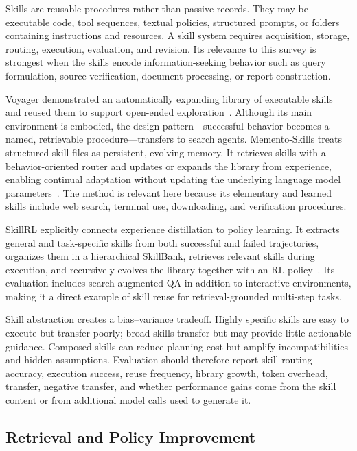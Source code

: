 Skills are reusable procedures rather than passive records. They may be executable code, tool sequences, textual policies, structured prompts, or folders containing instructions and resources. A skill system requires acquisition, storage, routing, execution, evaluation, and revision. Its relevance to this survey is strongest when the skills encode information-seeking behavior such as query formulation, source verification, document processing, or report construction.

Voyager demonstrated an automatically expanding library of executable skills and reused them to support open-ended exploration~\cite{wang2023voyager}. Although its main environment is embodied, the design pattern---successful behavior becomes a named, retrievable procedure---transfers to search agents. Memento-Skills treats structured skill files as persistent, evolving memory. It retrieves skills with a behavior-oriented router and updates or expands the library from experience, enabling continual adaptation without updating the underlying language model parameters~\cite{zhou2026mementoskills}. The method is relevant here because its elementary and learned skills include web search, terminal use, downloading, and verification procedures.

SkillRL explicitly connects experience distillation to policy learning. It extracts general and task-specific skills from both successful and failed trajectories, organizes them in a hierarchical SkillBank, retrieves relevant skills during execution, and recursively evolves the library together with an RL policy~\cite{xia2026skillrl}. Its evaluation includes search-augmented QA in addition to interactive environments, making it a direct example of skill reuse for retrieval-grounded multi-step tasks.

Skill abstraction creates a bias--variance tradeoff. Highly specific skills are easy to execute but transfer poorly; broad skills transfer but may provide little actionable guidance. Composed skills can reduce planning cost but amplify incompatibilities and hidden assumptions. Evaluation should therefore report skill routing accuracy, execution success, reuse frequency, library growth, token overhead, transfer, negative transfer, and whether performance gains come from the skill content or from additional model calls used to generate it.

\subsection{Retrieval and Policy Improvement}
\label{subsec:policy_improvement}

